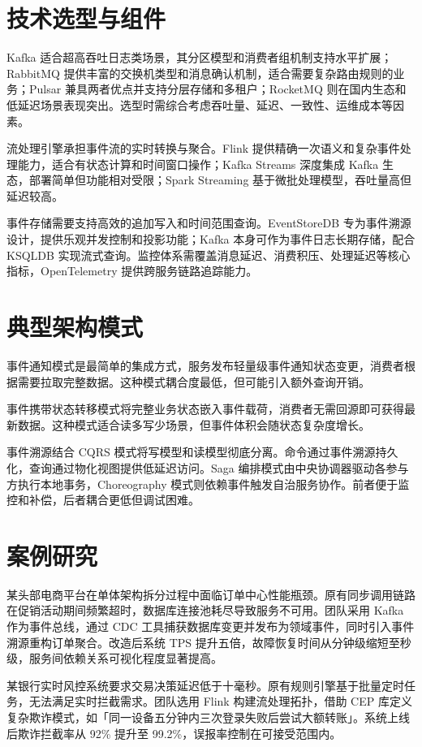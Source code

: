 \chapter{技术选型与组件}
Kafka 适合超高吞吐日志类场景，其分区模型和消费者组机制支持水平扩展；RabbitMQ 提供丰富的交换机类型和消息确认机制，适合需要复杂路由规则的业务；Pulsar 兼具两者优点并支持分层存储和多租户；RocketMQ 则在国内生态和低延迟场景表现突出。选型时需综合考虑吞吐量、延迟、一致性、运维成本等因素。\par
流处理引擎承担事件流的实时转换与聚合。Flink 提供精确一次语义和复杂事件处理能力，适合有状态计算和时间窗口操作；Kafka Streams 深度集成 Kafka 生态，部署简单但功能相对受限；Spark Streaming 基于微批处理模型，吞吐量高但延迟较高。\par
事件存储需要支持高效的追加写入和时间范围查询。EventStoreDB 专为事件溯源设计，提供乐观并发控制和投影功能；Kafka 本身可作为事件日志长期存储，配合 KSQLDB 实现流式查询。监控体系需覆盖消息延迟、消费积压、处理延迟等核心指标，OpenTelemetry 提供跨服务链路追踪能力。\par
\chapter{典型架构模式}
事件通知模式是最简单的集成方式，服务发布轻量级事件通知状态变更，消费者根据需要拉取完整数据。这种模式耦合度最低，但可能引入额外查询开销。\par
事件携带状态转移模式将完整业务状态嵌入事件载荷，消费者无需回源即可获得最新数据。这种模式适合读多写少场景，但事件体积会随状态复杂度增长。\par
事件溯源结合 CQRS 模式将写模型和读模型彻底分离。命令通过事件溯源持久化，查询通过物化视图提供低延迟访问。Saga 编排模式由中央协调器驱动各参与方执行本地事务，Choreography 模式则依赖事件触发自治服务协作。前者便于监控和补偿，后者耦合更低但调试困难。\par
\chapter{案例研究}
某头部电商平台在单体架构拆分过程中面临订单中心性能瓶颈。原有同步调用链路在促销活动期间频繁超时，数据库连接池耗尽导致服务不可用。团队采用 Kafka 作为事件总线，通过 CDC 工具捕获数据库变更并发布为领域事件，同时引入事件溯源重构订单聚合。改造后系统 TPS 提升五倍，故障恢复时间从分钟级缩短至秒级，服务间依赖关系可视化程度显著提高。\par
某银行实时风控系统要求交易决策延迟低于十毫秒。原有规则引擎基于批量定时任务，无法满足实时拦截需求。团队选用 Flink 构建流处理拓扑，借助 CEP 库定义复杂欺诈模式，如「同一设备五分钟内三次登录失败后尝试大额转账」。系统上线后欺诈拦截率从 92\%{} 提升至 99.2\%{}，误报率控制在可接受范围内。\par

